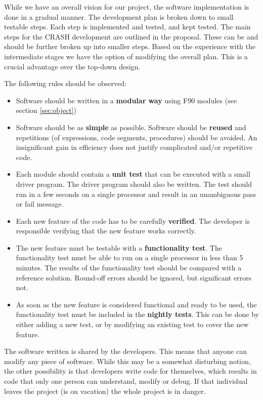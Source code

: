 \documentclass{article}
\begin{document}
While we have an overall vision for our project, the software implementation
is done in a gradual manner. The development plan is broken down to small 
testable steps. Each step is implemented and tested, and kept tested. The
main steps for the CRASH development are outlined in the proposal. These
can be and should be further broken up into smaller steps. Based on the
experience with the intermediate stages we have the option of modifying
the overall plan. This is a crucial advantage over the top-down design.

The following rules should be observed:
\begin{itemize}
\item Software should be written in a {\bf modular way} using F90 modules
      (see section \ref{sec:object})
\item Software should be as {\bf simple} as possible. Software should be
      {\bf reused} and repetitions (of expressions, code segments, procedures)
      should be avoided. An insignificant gain in efficiency does not 
      justify complicated and/or repetitive code.
\item Each module should contain a {\bf unit test} that can be executed with
      a small driver program. The driver program should also be written.
      The test should run in a few seconds on a single processor and
      result in an unambiguous pass or fail message.
\item Each new feature of the code has to be carefully {\bf verified}. The
      developer is responsible verifying that the new feature works correctly.
\item The new feature must be testable with a {\bf functionality test}. 
      The functionality test must be able to run on a single processor in less
      than 5 minutes. The results of the functionality test should be compared
      with a reference solution. Round-off errors should be ignored, but
      significant errors not. 
\item As soon as the new feature is considered functional and ready to be used,
      the functionality test must be included in the {\bf nightly tests}. 
      This can be done by either adding a new test, or by modifying an 
      existing test to cover the new feature. 
\end{itemize}

The software written is shared by the developers. This means that 
anyone can modify any piece of software. While this may be a somewhat
disturbing notion, the other possibility is that developers write code
for themselves, which results in code that only one person can understand,
modify or debug. If that individual leaves the project (is on vacation) the
whole project is in danger.
\end{document}
